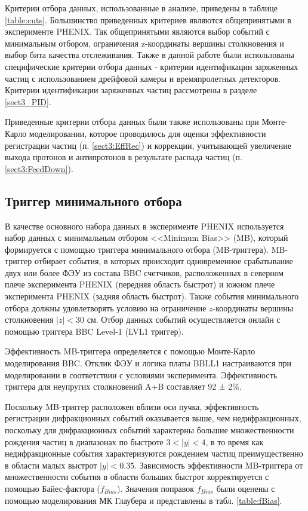 Критерии отбора данных, использованные в анализе, приведены в таблице \ref{table:cuts}. Большинство приведенных критериев являются общепринятыми в эксперименте PHENIX. Так общепринятыми являются  выбор событий с минимальным отбором, ограничения z-координаты вершины столкновения и выбор бита качества отслеживания. Также в данной работе были использованы специфические критерии отбора данных -  критерии идентификации заряженных частиц с использованием дрейфовой камеры и времяпролетных детекторов. Критерии идентификации заряженных частиц рассмотрены в разделе \ref{sect3_PID}.

Приведенные критерии отбора данных были также использованы при Монте-Карло моделировании, которое проводилось для оценки эффективности регистрации частиц (п. \ref{sect3:EffRec}) и коррекции, учитывающей увеличение выхода протонов и антипротонов в результате распада частиц (п. \ref{sect3:FeedDown}). 

\subsection{Триггер минимального отбора}
В качестве основного набора данных в эксперименте PHENIX используется набор данных с минимальным отбором <<Minimum Bias>> (MB), который формируется с помощью триггера минимального отбора (MB-триггера).
MB-триггер отбирает события, в которых происходит одновременное срабатывание двух или более ФЭУ из состава BBC счетчиков, расположенных в северном плече эксперимента PHENIX (передняя область быстрот) и южном плече эксперимента PHENIX (задняя область быстрот).
Также события минимального отбора должны удовлетворять условию на ограничение $z$-координаты вершины столкновения $|z| < $30 см. Отбор данных событий осуществляется онлайн с помощью триггера BBC Level-1 (LVL1 триггер).

Эффективность MB-триггера определяется с помощью Монте-Карло моделирования BBC. Отклик ФЭУ и логика платы BBLL1 настраиваются при моделировании в соответствии с условиями эксперимента. Эффективность триггера для неупругих столкновений A+B составляет 92 ± 2\%. 

Поскольку MB-триггер расположен вблизи оси пучка, эффективность регистрации дифракционных событий оказывается выше, чем недифракционных, поскольку для дифракционных событий характерны большие множественности рождения частиц в диапазонах по быстроте $3 <|y|<4$, в то время как недифракционные события характеризуются рождением частиц преимущественно в области малых выстрот $|y|<0.35$. Зависимость эффективности MB-триггера от множественности события в области больших быстрот корректируется с помощью Байес-фактора ($f_{Bias}$). 
Значения поправок $f_{Bias}$ были оценены с помощью моделирования МК Глаубера и представлены в табл. \ref{table:fBias}.

